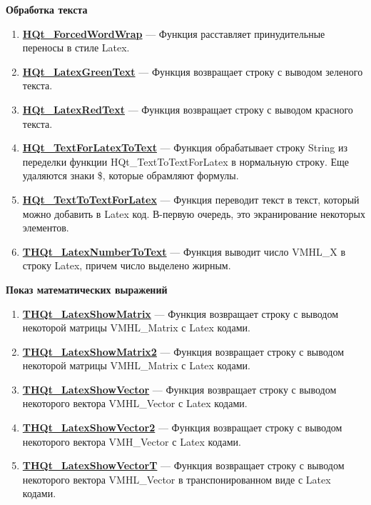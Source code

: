 \documentclass[a4paper,12pt]{article}
\begin{document}
\textbf{Обработка текста}
\begin{enumerate}

\item \textbf{\hyperref[HQt_ForcedWordWrap]{HQt\_ForcedWordWrap}} --- Функция расставляет принудительные переносы в стиле Latex.

\item \textbf{\hyperref[HQt_LatexGreenText]{HQt\_LatexGreenText}} --- Функция возвращает строку с выводом зеленого текста.

\item \textbf{\hyperref[HQt_LatexRedText]{HQt\_LatexRedText}} --- Функция возвращает строку с выводом красного текста.

\item \textbf{\hyperref[HQt_TextForLatexToText]{HQt\_TextForLatexToText}} --- Функция обрабатывает строку String из переделки функции HQt\_TextToTextForLatex в нормальную строку. Еще удаляются знаки \$, которые обрамляют формулы.

\item \textbf{\hyperref[HQt_TextToTextForLatex]{HQt\_TextToTextForLatex}} --- Функция переводит текст в текст, который можно добавить в Latex код. В-первую очередь, это экранирование некоторых элементов.

\item \textbf{\hyperref[THQt_LatexNumberToText]{THQt\_LatexNumberToText}} --- Функция выводит число VMHL\_X в строку Latex, причем число выделено жирным.

\end{enumerate}

\textbf{Показ математических выражений}
\begin{enumerate}

\item \textbf{\hyperref[THQt_LatexShowMatrix]{THQt\_LatexShowMatrix}} --- Функция возвращает строку с выводом некоторой матрицы VMHL\_Matrix с Latex кодами.

\item \textbf{\hyperref[THQt_LatexShowMatrix2]{THQt\_LatexShowMatrix2}} --- Функция возвращает строку с выводом некоторой матрицы VMHL\_Matrix с Latex кодами.

\item \textbf{\hyperref[THQt_LatexShowVector]{THQt\_LatexShowVector}} --- Функция возвращает строку с выводом некоторого вектора VMHL\_Vector с Latex кодами.

\item \textbf{\hyperref[THQt_LatexShowVector2]{THQt\_LatexShowVector2}} --- Функция возвращает строку с выводом некоторого вектора VMH\_Vector с Latex кодами.

\item \textbf{\hyperref[THQt_LatexShowVectorT]{THQt\_LatexShowVectorT}} --- Функция возвращает строку с выводом некоторого вектора VMHL\_Vector в транспонированном виде с Latex кодами.

\end{enumerate}
\end{document}
